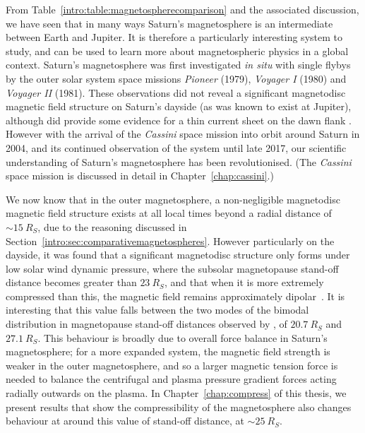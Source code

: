 From Table~\ref{intro:table:magnetospherecomparison} and the associated discussion, we have seen that in many ways Saturn's magnetosphere is an intermediate between Earth and Jupiter. It is therefore a particularly interesting system to study, and can be used to learn more about magnetospheric physics in a global context. Saturn's magnetosphere was first investigated \textit{in situ} with single flybys by the outer solar system space missions \textit{Pioneer} (1979), \textit{Voyager I} (1980) and \textit{Voyager II} (1981). These observations did not reveal a significant magnetodisc magnetic field structure on Saturn's dayside (as was known to exist at Jupiter), although did provide some evidence for a thin current sheet on the dawn flank \citep{smith1980}. However with the arrival of the \textit{Cassini} space mission into orbit around Saturn in 2004, and its continued observation of the system until late 2017, our scientific understanding of Saturn's magnetosphere has been revolutionised. (The \textit{Cassini} space mission is discussed in detail in Chapter~\ref{chap:cassini}.)

We now know that in the outer magnetosphere, a non-negligible magnetodisc magnetic field structure exists at all local times beyond a radial distance of ${\sim}\SI{15}{R_S}$, due to the reasoning discussed in Section~\ref{intro:sec:comparativemagnetospheres}. However particularly on the dayside, it was found that a significant magnetodisc structure only forms under low solar wind dynamic pressure, where the subsolar magnetopause stand-off distance becomes greater than $\SI{23}{R_S}$, and that when it is more extremely compressed than this, the magnetic field remains approximately dipolar~\citep{arridge2008}. It is interesting that this value falls between the two modes of the bimodal distribution in magnetopause stand-off distances observed by \citet{pilkington2015}, of $\SI{20.7}{R_S}$ and $\SI{27.1}{R_S}$. This behaviour is broadly due to overall force balance in Saturn's magnetosphere; for a more expanded system, the magnetic field strength is weaker in the outer magnetosphere, and so a larger magnetic tension force is needed to balance the centrifugal and plasma pressure gradient forces acting radially outwards on the plasma. In Chapter~\ref{chap:compress} of this thesis, we present results that show the compressibility of the magnetosphere also changes behaviour at around this value of stand-off distance, at ${\sim}\SI{25}{R_S}$. 

